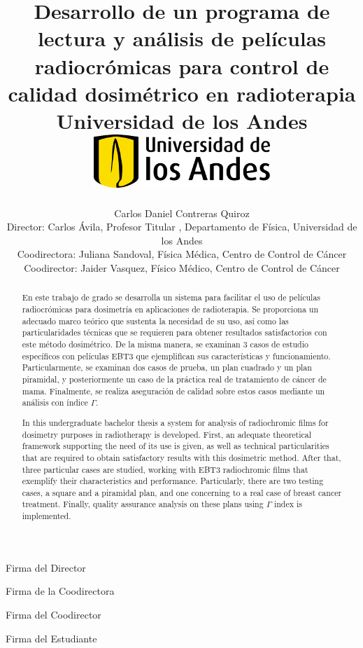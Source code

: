 \documentclass[12pt]{report}
\title 
{
	{Desarrollo de un programa de lectura y análisis de películas radiocrómicas para control de calidad dosimétrico en radioterapia}\\
	{\large Universidad de los Andes}\\
	\vspace{1.5cm}
	{\includegraphics[width = 0.5\textwidth]{logo.png}}	
}
\author{Carlos Daniel Contreras Quiroz\\[1cm]{\small Director: Carlos \'Avila, Profesor Titular , Departamento de Física, Universidad de los Andes}\\[1cm]{\small Coodirectora: Juliana Sandoval, Física Médica, Centro de  Control de Cáncer}\\[1cm]{\small Coodirector: Jaider Vasquez, Físico Médico, Centro de  Control de Cáncer}}
\newenvironment{dedication}
  {\clearpage           %
   \thispagestyle{empty}%
   \vspace*{\stretch{1}}%
   \raggedleft          %
  }
  {\par %
   \vspace{\stretch{3}} %
   \clearpage           %
  }
\theoremstyle{definition}
\begin{document}
\maketitle

\newpage
\thispagestyle{empty}
{\LARGE Firma del Director}\hrulefill
\vspace{1.5cm}

{\LARGE Firma de la Coodirectora}\hrulefill
\vspace{1.5cm}

{\LARGE Firma del Coodirector}\hrulefill
\vspace{1.5cm}


{\LARGE Firma del Estudiante}\hrulefill
\vspace{1.5cm}

\begin{abstract}

En este trabajo de grado se desarrolla un sistema para facilitar el uso de películas radiocrómicas para dosimetría en aplicaciones de radioterapia. Se proporciona un adecuado marco teórico que sustenta la necesidad de su uso, así como las particularidades técnicas que se requieren para obtener resultados satisfactorios con este método dosimétrico. De la misma manera, se examinan 3 casos de estudio específicos con películas EBT3 que ejemplifican sus características y funcionamiento. Particularmente, se examinan dos casos de prueba, un plan cuadrado y un plan piramidal, y posteriormente un caso de la práctica real de tratamiento de cáncer de mama. Finalmente, se realiza aseguración de calidad sobre estos casos mediante un análisis con índice $\Gamma$.   

\end{abstract}

\begin{otherlanguage}{english}
	
\begin{abstract}
In this undergraduate bachelor thesis a system for analysis of radiochromic films for dosimetry purposes in radiotherapy is developed. First, an adequate theoretical framework supporting the need of its use is given, as well as technical particularities that are required to obtain satisfactory results with this dosimetric method. After that, three particular cases are studied, working with EBT3 radiochromic films that exemplify their characteristics and performance. Particularly, there are two testing cases, a square and a piramidal plan, and one concerning to a real case of  breast cancer treatment. Finally, quality assurance analysis on these plans using $\Gamma$ index is implemented. 

\end{abstract}
\end{otherlanguage}
\end{document}
